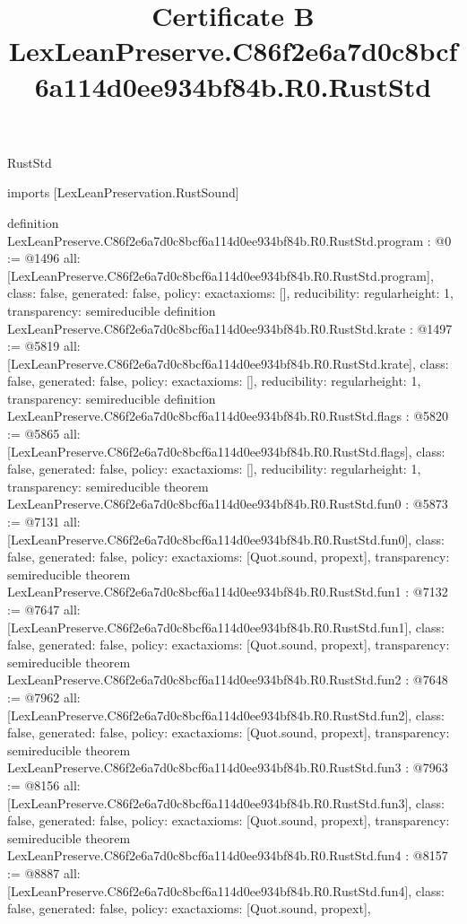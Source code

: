 \begin{lexlean}{RustStd}
\title{Certificate B LexLeanPreserve.C86f2e6a7d0c8bcf6a114d0ee934bf84b.R0.RustStd}
\begin{coremodule}
imports [LexLeanPreservation.RustSound]

definition LexLeanPreserve.C86f2e6a7d0c8bcf6a114d0ee934bf84b.R0.RustStd.program : @0 := @1496 {
  all: [LexLeanPreserve.C86f2e6a7d0c8bcf6a114d0ee934bf84b.R0.RustStd.program],
  class: false,
  generated: false,
  policy: exact{axioms: []},
  reducibility: regular{height: 1},
  transparency: semireducible
}
definition LexLeanPreserve.C86f2e6a7d0c8bcf6a114d0ee934bf84b.R0.RustStd.krate : @1497 := @5819 {
  all: [LexLeanPreserve.C86f2e6a7d0c8bcf6a114d0ee934bf84b.R0.RustStd.krate],
  class: false,
  generated: false,
  policy: exact{axioms: []},
  reducibility: regular{height: 1},
  transparency: semireducible
}
definition LexLeanPreserve.C86f2e6a7d0c8bcf6a114d0ee934bf84b.R0.RustStd.flags : @5820 := @5865 {
  all: [LexLeanPreserve.C86f2e6a7d0c8bcf6a114d0ee934bf84b.R0.RustStd.flags],
  class: false,
  generated: false,
  policy: exact{axioms: []},
  reducibility: regular{height: 1},
  transparency: semireducible
}
theorem LexLeanPreserve.C86f2e6a7d0c8bcf6a114d0ee934bf84b.R0.RustStd.fun0 : @5873 := @7131 {
  all: [LexLeanPreserve.C86f2e6a7d0c8bcf6a114d0ee934bf84b.R0.RustStd.fun0],
  class: false,
  generated: false,
  policy: exact{axioms: [Quot.sound, propext]},
  transparency: semireducible
}
theorem LexLeanPreserve.C86f2e6a7d0c8bcf6a114d0ee934bf84b.R0.RustStd.fun1 : @7132 := @7647 {
  all: [LexLeanPreserve.C86f2e6a7d0c8bcf6a114d0ee934bf84b.R0.RustStd.fun1],
  class: false,
  generated: false,
  policy: exact{axioms: [Quot.sound, propext]},
  transparency: semireducible
}
theorem LexLeanPreserve.C86f2e6a7d0c8bcf6a114d0ee934bf84b.R0.RustStd.fun2 : @7648 := @7962 {
  all: [LexLeanPreserve.C86f2e6a7d0c8bcf6a114d0ee934bf84b.R0.RustStd.fun2],
  class: false,
  generated: false,
  policy: exact{axioms: [Quot.sound, propext]},
  transparency: semireducible
}
theorem LexLeanPreserve.C86f2e6a7d0c8bcf6a114d0ee934bf84b.R0.RustStd.fun3 : @7963 := @8156 {
  all: [LexLeanPreserve.C86f2e6a7d0c8bcf6a114d0ee934bf84b.R0.RustStd.fun3],
  class: false,
  generated: false,
  policy: exact{axioms: [Quot.sound, propext]},
  transparency: semireducible
}
theorem LexLeanPreserve.C86f2e6a7d0c8bcf6a114d0ee934bf84b.R0.RustStd.fun4 : @8157 := @8887 {
  all: [LexLeanPreserve.C86f2e6a7d0c8bcf6a114d0ee934bf84b.R0.RustStd.fun4],
  class: false,
  generated: false,
  policy: exact{axioms: [Quot.sound, propext]},
}
\end{coremodule}
\end{lexlean}
